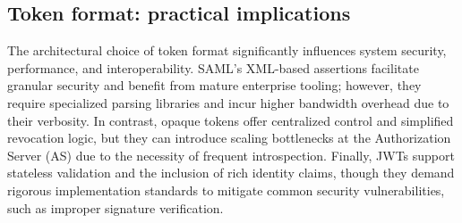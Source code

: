 \documentclass[../memoire.tex]{subfiles}
\begin{document}
\subsection{Token format: practical implications}

The architectural choice of token format significantly influences system security, performance, and interoperability. SAML's XML-based assertions facilitate granular security and benefit from mature enterprise tooling; however, they require specialized parsing libraries and incur higher bandwidth overhead due to their verbosity. In contrast, opaque tokens offer centralized control and simplified revocation logic, but they can introduce scaling bottlenecks at the Authorization Server (AS) due to the necessity of frequent introspection. Finally, JWTs support stateless validation and the inclusion of rich identity claims, though they demand rigorous implementation standards to mitigate common security vulnerabilities, such as improper signature verification.

\end{document}
